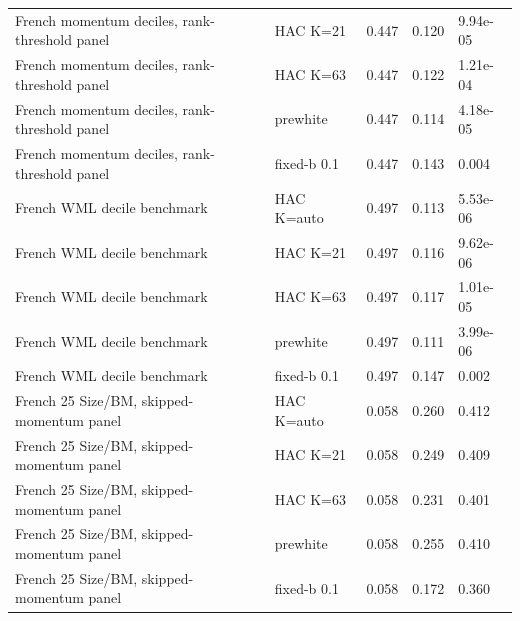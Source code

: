 \begin{table}[!htbp]
{\begin{tabular}{lllll}
French momentum deciles, rank-threshold panel & HAC K=21 & 0.447 & 0.120 & 9.94e-05 \\
French momentum deciles, rank-threshold panel & HAC K=63 & 0.447 & 0.122 & 1.21e-04 \\
French momentum deciles, rank-threshold panel & prewhite & 0.447 & 0.114 & 4.18e-05 \\
French momentum deciles, rank-threshold panel & fixed-b 0.1 & 0.447 & 0.143 & 0.004 \\
French WML decile benchmark & HAC K=auto & 0.497 & 0.113 & 5.53e-06 \\
French WML decile benchmark & HAC K=21 & 0.497 & 0.116 & 9.62e-06 \\
French WML decile benchmark & HAC K=63 & 0.497 & 0.117 & 1.01e-05 \\
French WML decile benchmark & prewhite & 0.497 & 0.111 & 3.99e-06 \\
French WML decile benchmark & fixed-b 0.1 & 0.497 & 0.147 & 0.002 \\
French 25 Size/BM, skipped-momentum panel & HAC K=auto & 0.058 & 0.260 & 0.412 \\
French 25 Size/BM, skipped-momentum panel & HAC K=21 & 0.058 & 0.249 & 0.409 \\
French 25 Size/BM, skipped-momentum panel & HAC K=63 & 0.058 & 0.231 & 0.401 \\
French 25 Size/BM, skipped-momentum panel & prewhite & 0.058 & 0.255 & 0.410 \\
French 25 Size/BM, skipped-momentum panel & fixed-b 0.1 & 0.058 & 0.172 & 0.360 \\
\bottomrule
\end{tabular}%
}
\end{table}


\clearpage

\begin{table}[!htbp]
\centering
\small
\caption{Decision-rule sensitivity by alpha threshold.}
\label{tab:gate-sensitivity}
\end{table}

